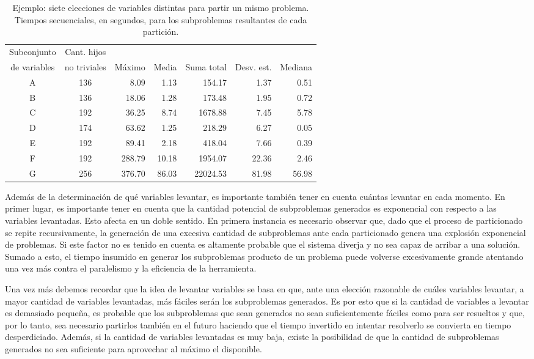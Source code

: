 \begin{table}
\begin{footnotesize}
\begin{tabular}{ccrrrrr}
\toprule
Subconjunto & Cant. hijos & & & & & \\
de variables & no triviales & M\'aximo & Media & Suma total & Desv.
est. & Mediana \\
\cmidrule(r){1-7}
A 	& 136 	& 8.09 		& 1.13 		& 154.17	 	& 1.37 		& 0.51 \\
B 	& 136 	& 18.06 		& 1.28 		& 173.48	 	& 1.95 		& 0.72 \\
C 	& 192 	& 36.25 		& 8.74 		& 1678.88 	& 7.45 		& 5.78 \\
D	& 174 	& 63.62 		& 1.25 		& 218.29	 	& 6.27 		& 0.05 \\
E	& 192 	& 89.41 		& 2.18 		& 418.04	 	& 7.66 		& 0.39 \\
F 	& 192 	& 288.79	 	& 10.18 		& 1954.07 	& 22.36 		& 2.46 \\
G 	& 256 	& 376.70	 	& 86.03 		& 22024.53 	& 81.98 		& 56.98 \\
\bottomrule
\end{tabular}
\end{footnotesize}
\caption{Ejemplo: siete elecciones de variables distintas para partir un mismo problema. Tiempos secuenciales, en segundos, para los subproblemas resultantes de cada partición.}\label{distrospamela8}
\end{table}


Además de la determinación de qué variables levantar, es importante también
tener en cuenta cuántas levantar en cada momento. En primer lugar, es
importante tener en cuenta que la cantidad potencial de subproblemas generados
es exponencial con respecto a las variables levantadas. Esto afecta en un
doble sentido. En primera instancia es necesario observar que, dado que el
proceso de particionado se repite recursivamente, la generación de una
excesiva cantidad de subproblemas ante cada particionado genera una explosión
exponencial de problemas. Si este factor no es tenido en cuenta es altamente
probable que el sistema diverja y no sea capaz de arribar a una solución.
Sumado a esto, el tiempo insumido en generar los subproblemas producto de un
problema puede volverse excesivamente grande atentando una vez más contra el
paralelismo y la eficiencia de la herramienta.

Una vez más debemos recordar que la idea de levantar variables se basa en que,
ante una elección razonable de cuáles variables levantar, a mayor cantidad de
variables levantadas, más fáciles serán los subproblemas generados. Es por
esto que si la cantidad de variables a levantar es demasiado pequeña, es
probable que los subproblemas que sean generados no sean suficientemente 
fáciles como para ser resueltos y que, por lo tanto, sea necesario partirlos también en el
futuro haciendo que el tiempo invertido en intentar resolverlo se convierta en
tiempo desperdiciado. Además, si la cantidad de variables levantadas es muy
baja, existe la posibilidad de que la cantidad de subproblemas generados no
sea suficiente para aprovechar al máximo el \hard disponible.

